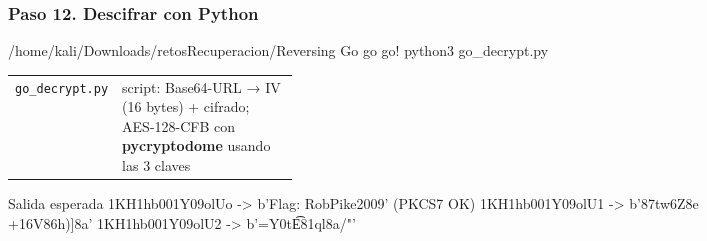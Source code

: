 \documentclass[11pt,a4paper]{article}
\begin{document}
\subsubsection*{Paso 12. Descifrar con Python}
\begin{comando}{/home/kali/Downloads/retosRecuperacion/Reversing Go go go!}
python3 go_decrypt.py
\end{comando}
\begin{tcolorbox}[enhanced, breakable, colback=white, colframe=gray!40, boxrule=0.3pt, arc=1pt, left=4pt, right=4pt, top=2pt, bottom=2pt, fonttitle=\sffamily\scriptsize\bfseries, coltitle=black!75, colbacktitle=gray!8, title={Qué hace cada parte}, attach title to upper, before skip=2pt, after skip=4pt, fontupper=\small]
\par{\renewcommand{\arraystretch}{1.12}\begin{tabularx}{\linewidth}{@{}>{\raggedright\arraybackslash}p{0.33\linewidth}>{\raggedright\arraybackslash}X@{}}
\texttt{go\_\allowbreak{}decrypt.py} & script: Base64-URL → IV (16 bytes) + cifrado; AES-128-CFB con \textbf{pycryptodome} usando las 3 claves \\
\end{tabularx}}
\end{tcolorbox}
\begin{salidan}{Salida esperada}
1KH1hb001Y09olUo -> b'Flag: RobPike2009' (PKCS7 OK)
1KH1hb001Y09olU1 -> b'\xd87tw\xa6Z\x8e\xcfN\xfbH\\+\xec\x16V\x86h)]\xcet{}\x8a' 
1KH1hb001Y09olU2 -> b'=Y\xe0tE\xde\t\x81ql\x8a\xbbHeS{}/\xfd{}"' 
\end{salidan}
\end{document}
